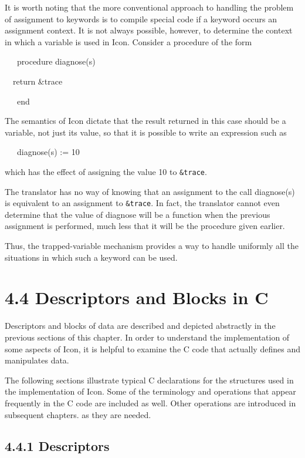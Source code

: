 It is worth noting that the more conventional approach to handling the
problem of assignment to keywords is to compile special code if a
keyword occurs an assignment context. It is not always possible,
however, to determine the context in which a variable is used in
Icon. Consider a procedure of the form

{\ttfamily\mdseries
\ \ \ procedure diagnose(s)}

{\ttfamily\mdseries
\ \ return \&trace}

{\ttfamily\mdseries
\ \ \ end}

The semantics of Icon dictate that the result returned in this case
should be a variable, not just its value, so that it is possible to
write an expression such as

{\ttfamily\mdseries
\ \ \ diagnose(s) := 10}

\noindent
which has the effect of assigning the value 10 to \texttt{\&trace}.

The translator has no way of knowing that an assignment to the call
diagnose(s) is equivalent to an assignment to \texttt{\&trace}. In
fact, the translator cannot even determine that the value of diagnose
will be a function when the previous assignment is performed, much
less that it will be the procedure given earlier.

Thus, the trapped-variable mechanism provides a way to handle
uniformly all the situations in which such a keyword can be used.

\section[4.4 Descriptors and Blocks in C]{4.4 Descriptors and Blocks in C}

Descriptors and blocks of data are described and depicted abstractly
in the previous sections of this chapter. In order to understand the
implementation of some aspects of Icon, it is helpful to examine the C
code that actually defines and manipulates data.

The following sections illustrate typical C declarations for the
structures used in the implementation of Icon. Some of the terminology
and operations that appear frequently in the C code are included as
well. Other operations are introduced in subsequent chapters. as they
are needed.

\subsection[4.4.1 Descriptors]{4.4.1 Descriptors}

